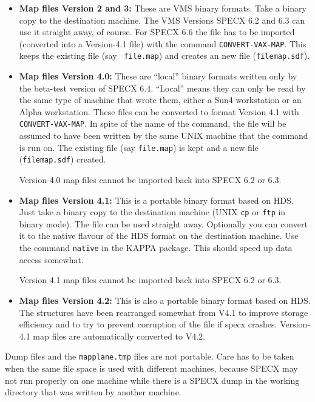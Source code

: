 \documentclass[twoside,11pt]{article}
\renewcommand{\_}{\texttt{\symbol{95}}}
\begin{document}
\begin{itemize}
\item {\bf Map files Version 2 and 3:}
    These are VMS binary formats. Take a binary
    copy to the destination machine. The VMS Versions SPECX 6.2 and 6.3
    can use it straight away, of course. For SPECX 6.6 the file has to
    be imported (converted into a Version-4.1 file) with the command
    {\tt CONVERT-VAX-MAP}. This keeps the existing file (say {\tt
    file.map}) and creates an new file ({\tt file\_map.sdf}).

\item {\bf Map files Version 4.0:}
    These are ``local'' binary formats written only by
    the beta-test version of SPECX 6.4. ``Local'' means they can only be
    read by the same type of machine that wrote them, either a Sun4
    workstation or an Alpha workstation. These files can be converted to
    format Version 4.1 with {\tt CONVERT-VAX-MAP}. In spite of the name of the
    command, the file will be assumed to have been written by the same
    UNIX machine that the command is run on. The existing file (say
    {\tt file.map}) is kept and a new file ({\tt file\_map.sdf}) created.

    Version-4.0 map files cannot be imported back into SPECX 6.2 or 6.3.

\item {\bf Map files Version 4.1:}
    This is a portable binary format based on HDS.
    Just take a binary copy to the destination machine (UNIX {\tt cp} or
    {\tt ftp} in binary mode). The file can be used straight away.
    Optionally you can convert it to the native flavour of the HDS
    format on the destination machine. Use the command {\tt native} in the
    KAPPA package. This should speed up data access somewhat.

    Version 4.1 map files cannot be imported back into SPECX 6.2 or 6.3.

\item {\bf Map files Version 4.2:}
    This is also a portable binary format based on HDS. The structures
have been rearranged somewhat from V4.1 to improve storage efficiency
and to try to prevent corruption of the file if specx crashes. Version-4.1
map files are automatically converted to V4.2.

\end{itemize}

Dump files and the {\tt mapplane.tmp} files are not portable. Care has to
be taken when the same file space is used with different machines,
because SPECX may not run properly on one machine while there is a SPECX
dump in the working directory that was written by another machine.
\end{document}
